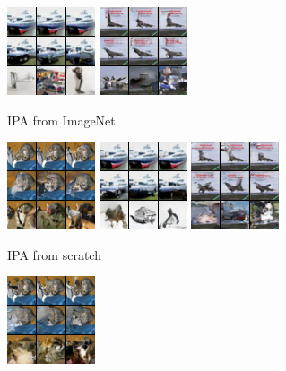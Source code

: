 \begin{figure}[t]
\begin{subfigure}[t]{0.17\textwidth}
      \includegraphics[height=\cifarimgheight]{figs/cigcvae/image-samples/cifar10/freeform_aipo_1_imagenet_samples}
      \includegraphics[height=\cifarimgheight]{figs/cigcvae/image-samples/cifar10/freeform_aipo_3_imagenet_samples}
      \caption{\scriptsize IPA from ImageNet}
    \end{subfigure}
    \begin{subfigure}[t]{0.17\textwidth}
      \centering
      \includegraphics[height=\cifarimgheight]{figs/cigcvae/image-samples/cifar10/freeform_aipo_0_scratch_samples}
      \includegraphics[height=\cifarimgheight]{figs/cigcvae/image-samples/cifar10/freeform_aipo_1_scratch_samples}
      \includegraphics[height=\cifarimgheight]{figs/cigcvae/image-samples/cifar10/freeform_aipo_3_scratch_samples}
      \caption{\scriptsize IPA from scratch}
    \end{subfigure}
    \begin{subfigure}[t]{0.17\textwidth}
      \centering
      \includegraphics[height=\cifarimgheight]{figs/cigcvae/image-samples/cifar10/freeform_aipo-r_0_samples}

\end{subfigure}
\end{figure}
